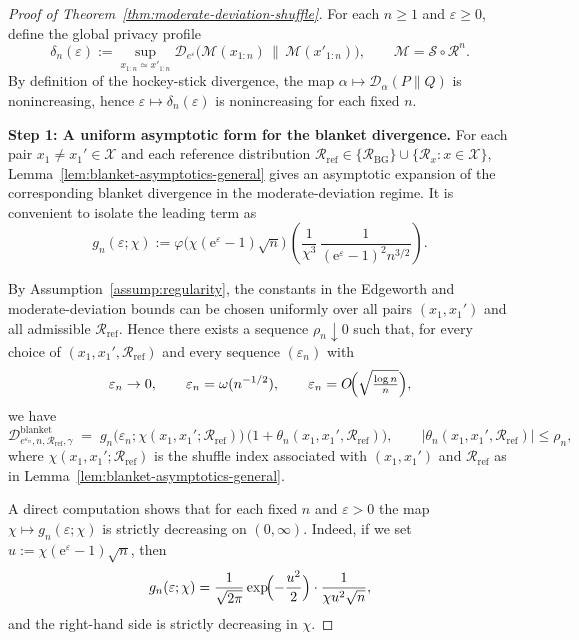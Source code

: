 \documentclass{article}
\theoremstyle{plain}
\theoremstyle{definition}
\begin{document}
\begin{proof}[Proof of Theorem~\ref{thm:moderate-deviation-shuffle}]
For each $n\ge1$ and $\varepsilon\ge0$, define the global privacy profile
\[
  \delta_n(\varepsilon)
  :=
  \sup_{x_{1:n}\simeq x'_{1:n}}
  \mathcal D_{e^\varepsilon}\bigl(
    \mathcal M(x_{1:n})
    \,\big\|\,
    \mathcal M(x'_{1:n})
  \bigr),
  \qquad
  \mathcal M = \mathcal S\circ\mathcal R^n.
\]
By definition of the hockey-stick divergence, the map
$\alpha\mapsto\mathcal D_\alpha(P\|Q)$ is nonincreasing, hence
$\varepsilon\mapsto\delta_n(\varepsilon)$ is nonincreasing for each fixed
$n$.

\medskip\noindent
\textbf{Step 1: A uniform asymptotic form for the blanket divergence.}
For each pair $x_1\neq x_1'\in\mathcal X$ and each reference distribution
$\mathcal R_{\mathrm{ref}}\in\{\mathcal R_{\mathrm{BG}}\}\cup\{\mathcal R_x:x\in\mathcal X\}$,
Lemma~\ref{lem:blanket-asymptotics-general} gives an asymptotic expansion
of the corresponding blanket divergence in the moderate-deviation regime.
It is convenient to isolate the leading term as
\[
  g_n(\varepsilon;\chi)
  :=
  \varphi\bigl(\chi(\mathrm e^\varepsilon-1)\sqrt{n}\bigr)\,
  \left(
    \frac{1}{\chi^3}\,
    \frac{1}{(\mathrm e^\varepsilon-1)^2 n^{3/2}}
  \right).
\]

By Assumption~\ref{assump:regularity}, the constants in the Edgeworth and
moderate-deviation bounds can be chosen uniformly over all pairs
$(x_1,x_1')$ and all admissible $\mathcal R_{\mathrm{ref}}$. Hence there
exists a sequence $\rho_n\downarrow0$ such that, for every
choice of $(x_1,x_1',\mathcal R_{\mathrm{ref}})$ and every sequence
$(\varepsilon_n)$ with
\[
  \varepsilon_n\to0,\qquad
  \varepsilon_n=\omega(n^{-1/2}),\qquad
  \varepsilon_n=O\!\Bigl(\sqrt{\tfrac{\log n}{n}}\Bigr),
\]
we have
\begin{equation}
  \label{eq:unif-blanket-asymptotic}
  \mathcal D^{\mathrm{blanket}}_{e^{\varepsilon_n},n,\mathcal R_{\mathrm{ref}},\gamma}
  \;=\;
  g_n\bigl(\varepsilon_n;\chi(x_1,x_1';\mathcal R_{\mathrm{ref}})\bigr)\,
  \bigl(1+\theta_n(x_1,x_1',\mathcal R_{\mathrm{ref}})\bigr),
  \qquad
  \bigl|\theta_n(x_1,x_1',\mathcal R_{\mathrm{ref}})\bigr|\le\rho_n,
\end{equation}
where $\chi(x_1,x_1';\mathcal R_{\mathrm{ref}})$ is the shuffle index
associated with $(x_1,x_1')$ and $\mathcal R_{\mathrm{ref}}$ as in
Lemma~\ref{lem:blanket-asymptotics-general}.

A direct computation shows that for each fixed $n$ and $\varepsilon>0$ the
map $\chi\mapsto g_n(\varepsilon;\chi)$ is strictly decreasing on
$(0,\infty)$. Indeed, if we set $u:=\chi(\mathrm e^\varepsilon-1)\sqrt{n}$,
then
\[
  g_n(\varepsilon;\chi)
  =
  \frac{1}{\sqrt{2\pi}}
  \exp\!\Bigl(-\frac{u^2}{2}\Bigr)
  \cdot
  \frac{1}{\chi u^2\sqrt{n}},
\]
and the right-hand side is strictly decreasing in $\chi$.


\end{proof}
\end{document}
